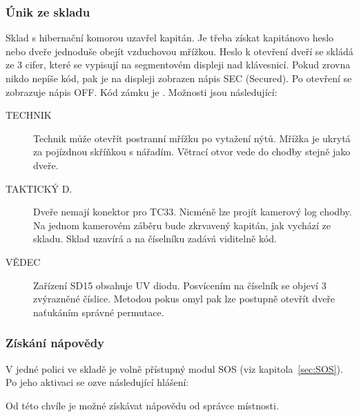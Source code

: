 \documentclass[11pt,oneside,a4paper]{article}
\begin{document}
\subsubsection{\texorpdfstring{Únik ze skladu}{Unik ze skladu}}
\label{subsubsec:unik_ze_skladu}
Sklad s hibernační komorou uzavřel kapitán. Je třeba získat kapitánovo heslo nebo dveře jednoduše obejít vzduchovou mřížkou. Heslo k otevření dveří se skládá ze 3 cifer, které se vypisují na segmentovém displeji nad klávesnicí. Pokud zrovna nikdo nepíše kód, pak je na displeji zobrazen nápis SEC (Secured). Po otevření se zobrazuje nápis OFF. Kód zámku je \textbf{}. Možnosti jsou následující:
\begin{description}
\item[TECHNIK] Technik může otevřít postranní mřížku po vytažení nýtů. Mřížka je ukrytá za pojízdnou skříňkou s nářadím. Větrací otvor vede do chodby stejně jako dveře.
\item[TAKTICKÝ D.] Dveře nemají konektor pro TC33. Nicméně lze projít kamerový log chodby. Na jednom kamerovém záběru bude zkrvavený kapitán, jak vychází ze skladu. Sklad uzavírá a na číselníku zadává viditelně kód.
\item[VĚDEC] Zařízení SD15 obsahuje UV diodu. Posvícením na číselník se objeví 3 zvýrazněné číslice. Metodou pokus omyl pak lze postupně otevřít dveře naťukáním správné permutace.
\end{description}

\subsubsection{\texorpdfstring{Získání nápovědy}{Ziskani napovedy}}
\label{subsubsec:ziskani_napovedy}

V jedné polici ve skladě je volně přístupný modul SOS (viz kapitola~\ref{sec:SOS}). Po jeho aktivaci se ozve následující hlášení:

\begin{quote}
\end{quote}

Od této chvíle je možné získávat nápovědu od správce místnosti.
\end{document}
